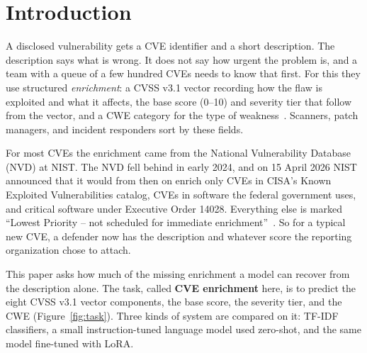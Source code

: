 \section{Introduction}

A disclosed vulnerability gets a CVE identifier and a short description.
The description says what is wrong.
It does not say how urgent the problem is, and a team with a queue of a few hundred CVEs needs to know that first.
For this they use structured \emph{enrichment}: a CVSS v3.1 vector recording how the flaw is exploited and what it affects, the base score (0--10) and severity tier that follow from the vector, and a CWE category for the type of weakness~\citep{first2019cvss31}.
Scanners, patch managers, and incident responders sort by these fields.

For most CVEs the enrichment came from the National Vulnerability Database (NVD) at NIST.
The NVD fell behind in early 2024, and on 15 April 2026 NIST announced that it would from then on enrich only CVEs in CISA's Known Exploited Vulnerabilities catalog, CVEs in software the federal government uses, and critical software under Executive Order 14028.
Everything else is marked ``Lowest Priority -- not scheduled for immediate enrichment''~\citep{nist2026nvd}.
So for a typical new CVE, a defender now has the description and whatever score the reporting organization chose to attach.

This paper asks how much of the missing enrichment a model can recover from the description alone.
The task, called \textbf{CVE enrichment} here, is to predict the eight CVSS v3.1 vector components, the base score, the severity tier, and the CWE (Figure~\ref{fig:task}).
Three kinds of system are compared on it: TF-IDF classifiers, a small instruction-tuned language model used zero-shot, and the same model fine-tuned with LoRA.

